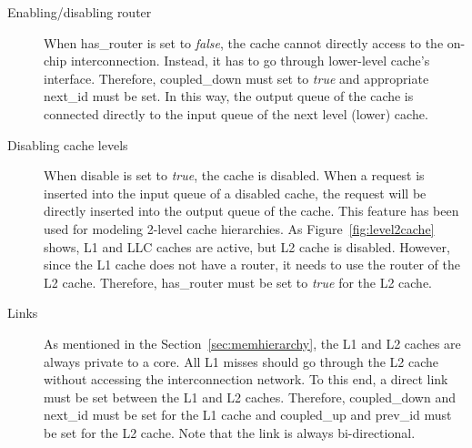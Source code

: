 \begin{description}
  \item[Enabling/disabling router] When \textsf{has\_router} is set to \textit{false},
  the cache cannot directly access to the on-chip
  interconnection. Instead, it has to go through lower-level cache's
  interface. Therefore, \textsf{coupled\_down} must set
  to \textit{true} and appropriate \textsf{next\_id} must be set. In
  this way, the output queue of the cache is connected directly to the
  input queue of the next level (lower) cache.

  \item[Disabling cache levels] When \textsf{disable} is set to \textit{true},
  the cache is disabled. When a request is inserted into the input queue of a
  disabled cache, the request will be directly inserted into the output queue
  of the cache. This feature has been used for modeling 2-level cache
  hierarchies. As Figure~\ref{fig:level2cache} shows, L1 and LLC caches are
  active, but L2 cache is disabled. However, since the L1 cache does not have a
  router, it needs to use the router of the L2 cache. Therefore,
  \textsf{has\_router} must be set to \textit{true} for the L2 cache.

  \item[Links] As mentioned in the Section~\ref{sec:memhierarchy}, the
  L1 and L2 caches are always private to a core. All L1 misses
  should go through the L2 cache without accessing the interconnection
  network. To this end, a direct link must be set between the L1 and
  L2 caches. Therefore, \textsf{coupled\_down} and \textsf{next\_id}
  must be set for the L1 cache and \textsf{coupled\_up}
  and \textsf{prev\_id} must be set for the L2 cache. Note that the
  link is always bi-directional.

\end{description}

